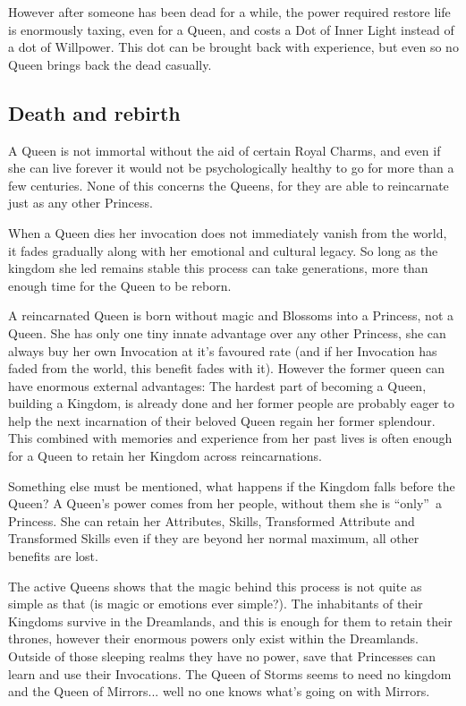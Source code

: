However after someone has been dead for a while, the power required restore life is enormously taxing, even for a Queen, and costs a Dot of Inner Light instead of a dot of Willpower. This dot can be brought back with experience, but even so no Queen brings back the dead casually.

\subsection*{Death and rebirth}

A Queen is not immortal without the aid of certain Royal Charms, and even if she can live forever it would not be psychologically healthy to go for more than a few centuries. None of this concerns the Queens, for they are able to reincarnate just as any other Princess. 

When a Queen dies her invocation does not immediately vanish from the world, it fades gradually along with her emotional and cultural legacy. So long as the kingdom she led remains stable this process can take generations, more than enough time for the Queen to be reborn. 

A reincarnated Queen is born without magic and Blossoms into a Princess, not a Queen. She has only one tiny innate advantage over any other Princess, she can always buy her own Invocation at it's favoured rate (and if her Invocation has faded from the world, this benefit fades with it). However the former queen can have enormous external advantages: The hardest part of becoming a Queen, building a Kingdom, is already done and her former people are probably eager to help the next incarnation of their beloved Queen regain her former splendour. This combined with memories and experience from her past lives is often enough for a Queen to retain her Kingdom across reincarnations. 

Something else must be mentioned, what happens if the Kingdom falls before the Queen? A Queen's power comes from her people, without them she is \textquotedblleft only\textquotedblright\, a Princess. She can retain her Attributes, Skills, Transformed Attribute and Transformed Skills even if they are beyond her normal maximum, all other benefits are lost. 

The active Queens shows that the magic behind this process is not quite as simple as that (is magic or emotions ever simple?). The inhabitants of their Kingdoms survive in the Dreamlands, and this is enough for them to retain their thrones, however their enormous powers only exist within the Dreamlands. Outside of those sleeping realms they have no power, save that Princesses can learn and use their Invocations. The Queen of Storms seems to need no kingdom and the Queen of Mirrors... well no one knows what's going on with Mirrors. 

